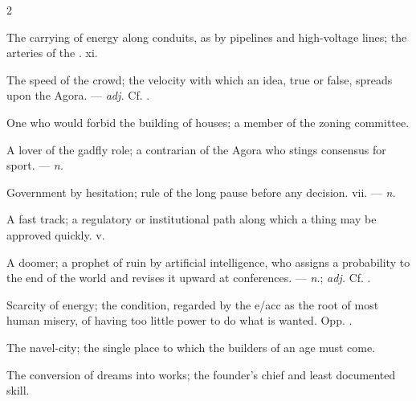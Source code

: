 \begin{multicols}{2}

 The carrying of energy along conduits, as by pipelines and high-voltage lines; the arteries of the .   xi.

 The speed of the crowd; the velocity with which an idea, true or false, spreads upon the Agora. —  \textit{adj.} Cf. .

  One who would forbid the building of houses; a member of the zoning committee.

 A lover of the gadfly role; a contrarian of the Agora who stings consensus for sport. —  \textit{n.}

 Government by hesitation; rule of the long pause before any decision.   vii. —  \textit{n.}

 A fast track; a regulatory or institutional path along which a thing may be approved quickly.   v.

 A doomer; a prophet of ruin by artificial intelligence, who assigns a probability to the end of the world and revises it upward at conferences. —  \textit{n.};  \textit{adj.} Cf. .

 Scarcity of energy; the condition, regarded by the e/acc as the root of most human misery, of having too little power to do what is wanted. Opp. .

 The navel-city; the single place to which the builders of an age must come.  

 The conversion of dreams into works; the founder's chief and least documented skill.


\end{multicols}
